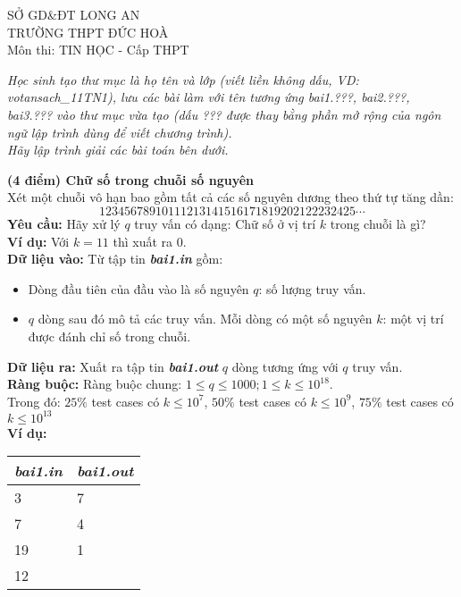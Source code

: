 \begin{name}
	{SỞ GD\&ĐT LONG AN \\ TRƯỜNG THPT ĐỨC HOÀ}
	{\testname \\ Môn thi: TIN HỌC - Cấp THPT}
\end{name}

\textit{Học sinh tạo thư mục là họ tên và lớp (viết liền không dấu, VD: votansach\_11TN1), lưu các bài làm với tên tương ứng bai1.???, bai2.???, bai3.??? vào thư mục vừa tạo (dấu ??? được thay bằng phần mở rộng của ngôn ngữ lập trình dùng để viết chương trình).\\
Hãy lập trình giải các bài toán bên dưới.}

\begin{ex}
	\textbf{(4 điểm) Chữ số trong chuỗi số nguyên}\\
	Xét một chuỗi vô hạn bao gồm tất cả các số nguyên dương theo thứ tự tăng dần: 
	$$12345678910111213141516171819202122232425\cdots$$
	\textbf{Yêu cầu: }Hãy xử lý $q$ truy vấn có dạng: Chữ số ở vị trí $k$ trong chuỗi là gì?\\
	\textbf{Ví dụ: } Với $k=11$ thì xuất ra $0$.\\
	\textbf{Dữ liệu vào: } Từ tập tin \textit{\textbf{bai1.in}} gồm: 
	\begin{itemize}
		\item Dòng đầu tiên của đầu vào là số nguyên $q$: số lượng truy vấn. 
		\item $q$ dòng sau đó mô tả các truy vấn. Mỗi dòng có một số nguyên $k$: một vị trí được đánh chỉ số trong chuỗi. 
	\end{itemize}
	\textbf{Dữ liệu ra: } Xuất ra tập tin \textit{\textbf{bai1.out}} $q$ dòng tương ứng với $q$ truy vấn.\\
	\textbf{Ràng buộc: } Ràng buộc chung: $1 \leq q \leq 1000; 1 \leq k \leq 10^{18}$.\\
	 Trong đó: 
	$25\%$ test cases có $k \leq 10^7$,  $50\%$ test cases có $k \leq 10^9$,  $75\%$ test cases có $k \leq 10^{13}$\\
	\textbf{Ví dụ: }
	\begin{center}
		\begin{tabular}{|l|l|}
			\hline
			\textit{\textbf{bai1.in}} & \textit{\textbf{bai1.out}} \\
			\hline
			3 & 7\\
			7 & 4 \\
			19 & 1 \\
			12 & \\
			\hline
		\end{tabular}
	\end{center}
\end{ex}


